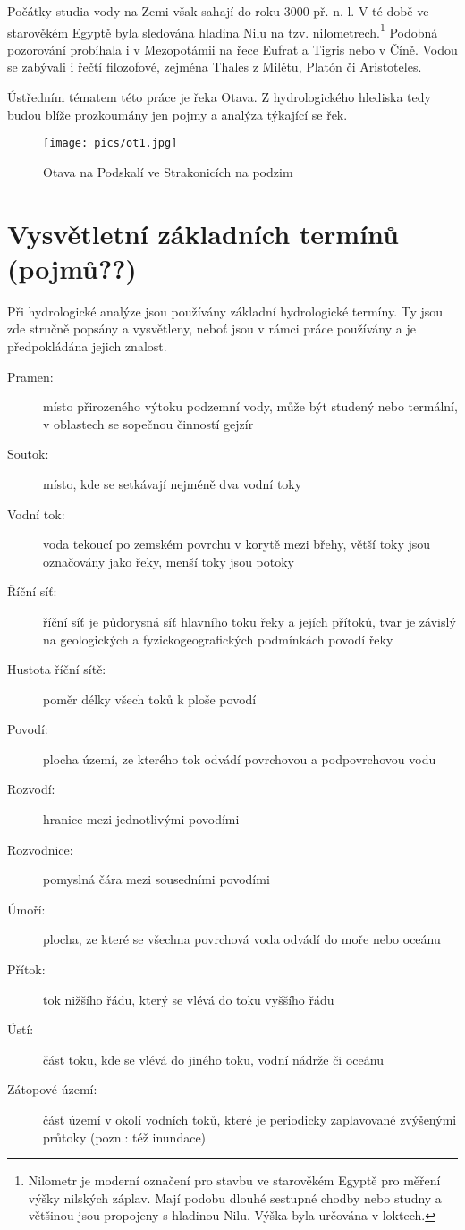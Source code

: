 \documentclass[thesis=M,czech]{FITthesis}[2012/06/26]
\begin{document}
Počátky studia vody na Zemi však sahají do roku 3000 př. n. l. V té době ve starověkém Egyptě byla sledována hladina Nilu na tzv. nilometrech.\footnote{Nilometr je moderní označení pro stavbu ve starověkém Egyptě pro měření výšky nilských záplav. Mají podobu dlouhé sestupné chodby nebo studny a většinou jsou propojeny s hladinou Nilu. Výška byla určována v loktech.} Podobná pozorování probíhala i v Mezopotámii na řece Eufrat a Tigris nebo v Číně. Vodou se zabývali i řečtí filozofové, zejména Thales z Milétu, Platón či Aristoteles. 


Ústředním tématem této práce je řeka Otava. Z hydrologického hlediska tedy budou blíže prozkoumány jen pojmy a analýza týkající se řek.


\begin{figure}[h!]
	\centering
	\texttt{[image: pics/ot1.jpg]}
	\caption{Otava na Podskalí ve Strakonicích na podzim}
	\label{obrazek:ot1}
\end{figure}


\section{Vysvětletní základních termínů (pojmů??)}
Při hydrologické analýze jsou používány základní hydrologické termíny. Ty jsou zde stručně popsány a vysvětleny, neboť jsou v rámci práce používány a je předpokládána jejich znalost.


\begin{description}
\item[Pramen:] místo přirozeného výtoku podzemní vody, může být studený nebo termální, v oblastech se sopečnou činností gejzír
\item[Soutok:] místo, kde se setkávají nejméně dva vodní toky
\item[Vodní tok:] voda tekoucí po zemském povrchu v korytě mezi břehy, větší toky jsou označovány jako řeky, menší toky jsou potoky
\item[Říční síť:] říční síť je půdorysná síť hlavního toku řeky a jejích přítoků, tvar je závislý na geologických a fyzickogeografických podmínkách povodí řeky
\item[Hustota říční sítě:] poměr délky všech toků k ploše povodí
\item[Povodí:] plocha území, ze kterého tok odvádí povrchovou a podpovrchovou vodu
\item[Rozvodí:] hranice mezi jednotlivými povodími
\item[Rozvodnice:] pomyslná čára mezi sousedními povodími
\item[Úmoří:] plocha, ze které se všechna povrchová voda odvádí do moře nebo oceánu
\item[Přítok:] tok nižšího řádu, který se vlévá do toku vyššího řádu
\item[Ústí:] část toku, kde se vlévá do jiného toku, vodní nádrže či oceánu
\item[Zátopové území:] část území v okolí vodních toků, které je periodicky zaplavované zvýšenými průtoky (pozn.: též inundace)
\end{description}
\end{document}
